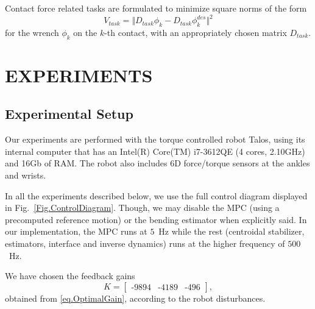 \documentclass[letterpaper, 10 pt, conference]{ieeeconf}  %
\begin{document}
Contact force related tasks are formulated to minimize square norms of the form 
%
\begin{equation}
    V_\mathit{task} = \Vert D_\mathit{task}\phi_k - D_\mathit{task}\phi_k^\mathit{des}\Vert^2
\end{equation}
%
for the wrench $ \phi_k $ on the $k$-th contact, with an appropriately chosen matrix $D_\mathit{task}$.

\section{EXPERIMENTS}\label{Sec.Experiments}


\subsection{Experimental Setup}

Our experiments are performed with the torque controlled robot Talos, using its internal computer that has an Intel(R) Core(TM) i7-3612QE (4 cores, 2.10GHz) and 16Gb of RAM. The robot also includes 6D force/torque sensors at the ankles and wrists.

In all the experiments described below, we use the full control diagram displayed in Fig.~\ref{Fig.ControlDiagram}. Though, we may disable the MPC (using a precomputed reference motion) or the bending estimator when explicitly said. In our implementation, the MPC runs at $ 5 $~Hz while the rest (centroidal stabilizer, estimators, interface and  inverse dynamics) runs at the higher frequency of $500$~Hz.


We have chosen the feedback gains 
\begin{equation}
    K = \begin{bmatrix} \texttt{-}9894 & \texttt{-}4189 & \texttt{-}496 \end{bmatrix},
\end{equation}
%
obtained from \eqref{eq.OptimalGain}, according to the robot disturbances.
\end{document}
